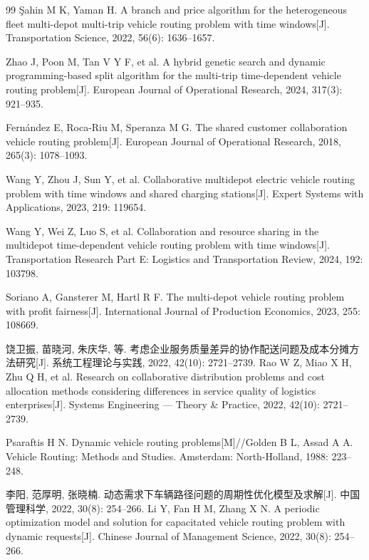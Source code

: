 \begin{thebibliography}{99}
 Şahin M K, Yaman H. A branch and price algorithm for the heterogeneous fleet multi-depot multi-trip vehicle routing problem with time windows[J]. Transportation Science, 2022, 56(6): 1636--1657.

 Zhao J, Poon M, Tan V Y F, et al. A hybrid genetic search and dynamic programming-based split algorithm for the multi-trip time-dependent vehicle routing problem[J]. European Journal of Operational Research, 2024, 317(3): 921--935.

 Fern\'{a}ndez E, Roca-Riu M, Speranza M G. The shared customer collaboration vehicle routing problem[J]. European Journal of Operational Research, 2018, 265(3): 1078--1093.

 Wang Y, Zhou J, Sun Y, et al. Collaborative multidepot electric vehicle routing problem with time windows and shared charging stations[J]. Expert Systems with Applications, 2023, 219: 119654.

 Wang Y, Wei Z, Luo S, et al. Collaboration and resource sharing in the multidepot time-dependent vehicle routing problem with time windows[J]. Transportation Research Part E: Logistics and Transportation Review, 2024, 192: 103798.

 Soriano A, Gansterer M, Hartl R F. The multi-depot vehicle routing problem with profit fairness[J]. International Journal of Production Economics, 2023, 255: 108669.

 饶卫振, 苗晓河, 朱庆华, 等. 考虑企业服务质量差异的协作配送问题及成本分摊方法研究[J]. 系统工程理论与实践, 2022, 42(10): 2721--2739.\newline
Rao W Z, Miao X H, Zhu Q H, et al. Research on collaborative distribution problems and cost allocation methods considering differences in service quality of logistics enterprises[J]. Systems Engineering --- Theory \& Practice, 2022, 42(10): 2721--2739.

 Psaraftis H N. Dynamic vehicle routing problems[M]//Golden B L, Assad A A. Vehicle Routing: Methods and Studies. Amsterdam: North-Holland, 1988: 223--248.

 李阳, 范厚明, 张晓楠. 动态需求下车辆路径问题的周期性优化模型及求解[J]. 中国管理科学, 2022, 30(8): 254--266.\newline
Li Y, Fan H M, Zhang X N. A periodic optimization model and solution for capacitated vehicle routing problem with dynamic requests[J]. Chinese Journal of Management Science, 2022, 30(8): 254--266.


\end{thebibliography}
